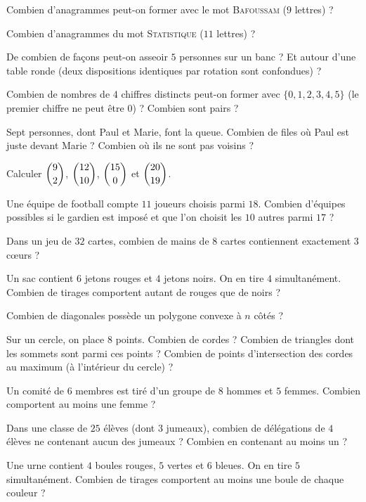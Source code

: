 \exo{} Combien d'anagrammes peut-on former avec le mot \textsc{Bafoussam} ($9$ lettres) ?

\exo{} Combien d'anagrammes du mot \textsc{Statistique} ($11$ lettres) ?

\exo{} De combien de façons peut-on asseoir $5$ personnes sur un banc ? Et autour
d'une table ronde (deux dispositions identiques par rotation sont confondues) ?

\exo{} Combien de nombres de $4$ chiffres distincts peut-on former avec
$\{0,1,2,3,4,5\}$ (le premier chiffre ne peut être $0$) ? Combien sont pairs ?

\exo{} Sept personnes, dont Paul et Marie, font la queue. Combien de files où
Paul est juste devant Marie ? Combien où ils ne sont pas voisins ?

\exo{} Calculer $\dbinom{9}{2}$, $\dbinom{12}{10}$, $\dbinom{15}{0}$ et $\dbinom{20}{19}$.

\exo{} Une équipe de football compte $11$ joueurs choisis parmi $18$. Combien
d'équipes possibles si le gardien est imposé et que l'on choisit les $10$ autres parmi $17$ ?

\exo{} Dans un jeu de $32$ cartes, combien de mains de $8$ cartes contiennent
exactement $3$ c{\oe}urs ?

\exo{} Un sac contient $6$ jetons rouges et $4$ jetons noirs. On en tire $4$
simultanément. Combien de tirages comportent autant de rouges que de noirs ?

\exo{} Combien de diagonales possède un polygone convexe à $n$ côtés ?

\exo{} Sur un cercle, on place $8$ points. Combien de cordes ? Combien de triangles
dont les sommets sont parmi ces points ? Combien de points d'intersection des cordes au
maximum (à l'intérieur du cercle) ?

\exo{} Un comité de $6$ membres est tiré d'un groupe de $8$ hommes et $5$ femmes.
Combien comportent au moins une femme ?

\exo{} Dans une classe de $25$ élèves (dont $3$ jumeaux), combien de délégations de
$4$ élèves ne contenant aucun des jumeaux ? Combien en contenant au moins un ?

\exo{} Une urne contient $4$ boules rouges, $5$ vertes et $6$ bleues. On en tire
$5$ simultanément. Combien de tirages comportent au moins une boule de chaque couleur ?

